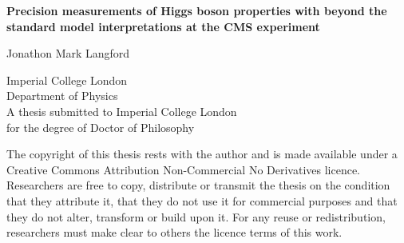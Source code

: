 \begin{titlepage}
    \begin{center}
        \vspace*{2cm}
        
        \huge{\textbf{Precision measurements of Higgs boson properties with beyond the standard model interpretations at the CMS experiment}}

        \vspace{1.5cm}
        \normalsize
        Jonathon Mark Langford
        
        \vspace{0.5cm}
        Imperial College London\\
        Department of Physics\\

        \vspace{5cm}
        A thesis submitted to Imperial College London\\
        for the degree of Doctor of Philosophy\\
        
    \end{center}
\end{titlepage}

The copyright of this thesis rests with the author and is made available under a Creative Commons Attribution Non-Commercial No Derivatives licence. Researchers are free to copy, distribute or transmit the thesis on the condition that they attribute it, that they do not use it for commercial purposes and that they do not alter, transform or build upon it. For any reuse or redistribution, researchers must make clear to others the licence terms of this work.
